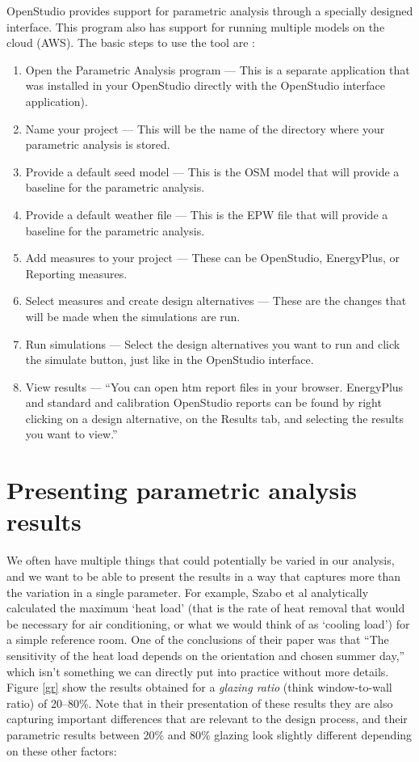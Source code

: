 \documentclass[10pt]{article}
\begin{document}
OpenStudio provides support for parametric analysis through a specially designed interface. This program also has support for running multiple models on the cloud (AWS). The basic steps to use the tool are \cite{noauthor_undated-yz}:

\begin{enumerate}
    \setlength{\itemsep}{0pt}%
    \setlength{\parskip}{0pt}%
    \item Open the Parametric Analysis program --- This is a separate application that was installed in your OpenStudio directly with the OpenStudio interface application).
    \item Name your project --- This will be the name of the directory where your parametric analysis is stored.
    \item Provide a default seed model --- This is the OSM model that will provide a baseline for the parametric analysis.
    \item Provide a default weather file --- This is the EPW file that will provide a baseline for the parametric analysis.
    \item Add measures to your project --- These can be OpenStudio, EnergyPlus, or Reporting measures.
    \item Select measures and create design alternatives --- These are the changes that will be made when the simulations are run.
    \item Run simulations --- Select the design alternatives you want to run and click the simulate button, just like in the OpenStudio interface.
    \item View results --- ``You can open htm report files
in your browser. EnergyPlus and
standard and calibration OpenStudio reports can be found by right
clicking on a design alternative, on
the Results tab, and selecting the
results you want to view.'' \cite{noauthor_undated-ks}
\end{enumerate}

\section{Presenting parametric analysis results}

We often have multiple things that could potentially be varied in our analysis, and we want to be able to present the results in a way that captures more than the variation in a single parameter. For example, Szabo et al \cite{L_Szabo2018-nh} analytically calculated the maximum `heat load' (that is the rate of heat removal that would be necessary for air conditioning, or what we would think of as `cooling load') for a simple reference room. One of the conclusions of their paper was that ``The sensitivity of the heat load depends on the orientation and chosen summer day,'' which isn't something we can directly put into practice without more details. Figure \ref{gr} show the results obtained for a \textit{glazing ratio} (think window-to-wall ratio) of 20--80\%. Note that in their presentation of these results they are also capturing important differences that are relevant to the design process, and their parametric results between 20\% and 80\% glazing look slightly different depending on these other factors:
\end{document}
